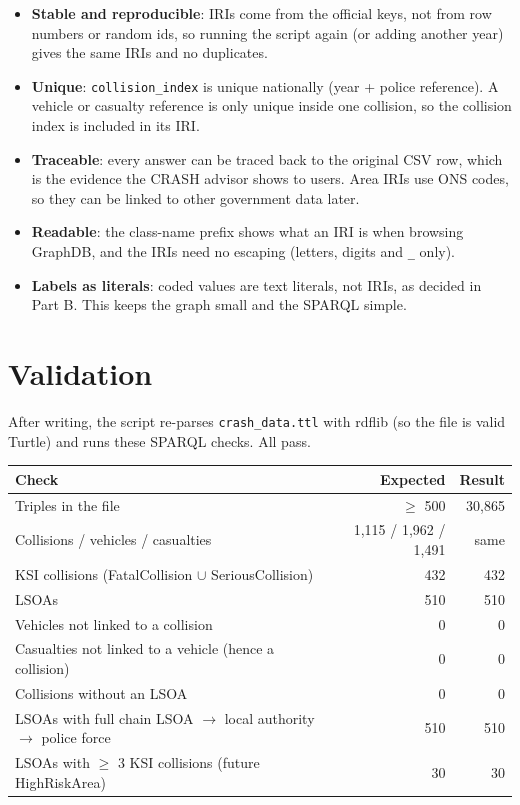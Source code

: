 \documentclass[10.5pt,a4paper]{article}
\newcommand{\cls}[1]{\textsf{#1}}
\begin{document}
\begin{itemize}[nosep]
\item \textbf{Stable and reproducible}: IRIs come from the official keys, not from row numbers or random ids, so running the script again (or adding another year) gives the same IRIs and no duplicates.
\item \textbf{Unique}: \texttt{collision\_index} is unique nationally (year + police reference). A vehicle or casualty reference is only unique inside one collision, so the collision index is included in its IRI.
\item \textbf{Traceable}: every answer can be traced back to the original CSV row, which is the evidence the CRASH advisor shows to users. Area IRIs use ONS codes, so they can be linked to other government data later.
\item \textbf{Readable}: the class-name prefix shows what an IRI is when browsing GraphDB, and the IRIs need no escaping (letters, digits and \texttt{\_} only).
\item \textbf{Labels as literals}: coded values are text literals, not IRIs, as decided in Part B. This keeps the graph small and the SPARQL simple.
\end{itemize}

\section{Validation}
After writing, the script re-parses \texttt{crash\_data.ttl} with rdflib (so the file is valid Turtle) and runs these SPARQL checks. All pass.

\begin{center}\small
\begin{tabular}{L{9.6cm} r r}
\toprule \textbf{Check} & \textbf{Expected} & \textbf{Result}\\\midrule
Triples in the file & $\geq$ 500 & 30,865\\
Collisions / vehicles / casualties & 1,115 / 1,962 / 1,491 & same\\
KSI collisions (\cls{FatalCollision} $\cup$ \cls{SeriousCollision}) & 432 & 432\\
LSOAs & 510 & 510\\
Vehicles not linked to a collision & 0 & 0\\
Casualties not linked to a vehicle (hence a collision) & 0 & 0\\
Collisions without an LSOA & 0 & 0\\
LSOAs with full chain LSOA $\rightarrow$ local authority $\rightarrow$ police force & 510 & 510\\
LSOAs with $\geq$ 3 KSI collisions (future \cls{HighRiskArea}) & 30 & 30\\
\bottomrule
\end{tabular}\end{center}
\end{document}
